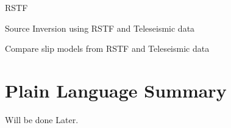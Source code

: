 \documentclass[draft]{agujournal2019}
\begin{document}


\begin{keypoints}
\item RSTF 
\item Source Inversion using RSTF and Teleseismic data
\item Compare slip models from RSTF and Teleseismic data
\end{keypoints}

%
%

%
%


\begin{abstract}
Will be done Later.
\end{abstract}

\section*{Plain Language Summary}
Will be done Later.
%
%
\end{document}
